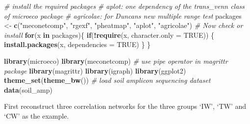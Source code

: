 \documentclass[
]{book}
\newenvironment{Shaded}{\begin{snugshade}}{\end{snugshade}}
\newcommand{\AttributeTok}[1]{\textcolor[rgb]{0.13,0.29,0.53}{#1}}
\newcommand{\CommentTok}[1]{\textcolor[rgb]{0.56,0.35,0.01}{\textit{#1}}}
\newcommand{\ConstantTok}[1]{\textcolor[rgb]{0.56,0.35,0.01}{#1}}
\newcommand{\ControlFlowTok}[1]{\textcolor[rgb]{0.13,0.29,0.53}{\textbf{#1}}}
\newcommand{\FunctionTok}[1]{\textcolor[rgb]{0.13,0.29,0.53}{\textbf{#1}}}
\newcommand{\NormalTok}[1]{#1}
\newcommand{\OtherTok}[1]{\textcolor[rgb]{0.56,0.35,0.01}{#1}}
\newcommand{\SpecialCharTok}[1]{\textcolor[rgb]{0.81,0.36,0.00}{\textbf{#1}}}
\newcommand{\StringTok}[1]{\textcolor[rgb]{0.31,0.60,0.02}{#1}}
\begin{document}
\begin{Shaded}
\begin{Highlighting}[]
\CommentTok{\# install the required packages}
\CommentTok{\# aplot: one dependency of the trans\_venn class of microeco package}
\CommentTok{\# agricolae: for Duncan\textquotesingle{}s new multiple range test}
\NormalTok{packages }\OtherTok{\textless{}{-}} \FunctionTok{c}\NormalTok{(}\StringTok{"meconetcomp"}\NormalTok{, }\StringTok{"rgexf"}\NormalTok{, }\StringTok{"pheatmap"}\NormalTok{, }\StringTok{"aplot"}\NormalTok{, }\StringTok{"agricolae"}\NormalTok{)}
\CommentTok{\# Now check or install}
\ControlFlowTok{for}\NormalTok{(x }\ControlFlowTok{in}\NormalTok{ packages)\{}
    \ControlFlowTok{if}\NormalTok{(}\SpecialCharTok{!}\FunctionTok{require}\NormalTok{(x, }\AttributeTok{character.only =} \ConstantTok{TRUE}\NormalTok{)) \{}
        \FunctionTok{install.packages}\NormalTok{(x, }\AttributeTok{dependencies =} \ConstantTok{TRUE}\NormalTok{)}
\NormalTok{    \}}
\NormalTok{\}}
\end{Highlighting}
\end{Shaded}

\begin{Shaded}
\begin{Highlighting}[]
\FunctionTok{library}\NormalTok{(microeco)}
\FunctionTok{library}\NormalTok{(meconetcomp)}
\CommentTok{\# use pipe operator in magrittr package}
\FunctionTok{library}\NormalTok{(magrittr)}
\FunctionTok{library}\NormalTok{(igraph)}
\FunctionTok{library}\NormalTok{(ggplot2)}
\FunctionTok{theme\_set}\NormalTok{(}\FunctionTok{theme\_bw}\NormalTok{())}
\CommentTok{\# load soil amplicon sequencing dataset}
\FunctionTok{data}\NormalTok{(soil\_amp)}
\end{Highlighting}
\end{Shaded}

First reconstruct three correlation networks for the three groups `IW', `TW' and `CW' as the example.
\end{document}
